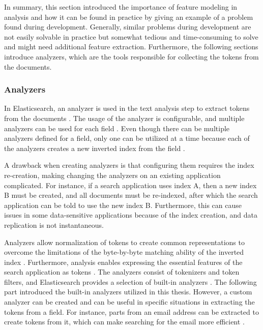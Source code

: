 In summary, this section introduced the importance of feature modeling in analysis and 
how it can be found in practice by giving an example of a problem found during development.
Generally, similar problems during development are not easily solvable in practice but somewhat
tedious and time-consuming to solve and might need additional feature extraction.
Furthermore, the following sections introduce analyzers, which are the tools responsible
for collecting the tokens from the documents.


\subsubsection{Analyzers}

In Elasticsearch, an analyzer is used in the text analysis step to extract tokens from the documents \cite{elasticIntro}.
The usage of the analyzer is configurable, and multiple analyzers can be used for each field \cite{relevantSearch}.
Even though there can be multiple analyzers defined for a field, only one can be utilized at a time
because each of the analyzers creates a new inverted index from the field \cite{relevantSearch}.


A drawback when creating analyzers is that configuring them requires the index re-creation, making changing the analyzers 
on an existing application complicated.
For instance, if a search application uses index A, then a new index B must be created, and 
all documents must be re-indexed,
after which the search application can be told to use the new index B.
Furthermore, this can cause issues in some data-sensitive applications because of the index creation, 
and data replication is not instantaneous.


Analyzers allow normalization of tokens to create common representations to overcome the limitations of the byte-by-byte
matching ability of the inverted index \cite{relevantSearch}.
Furthermore, analysis enables expressing the essential features of the search application as tokens \cite{relevantSearch}.
The analyzers consist of tokenizers and token filters, and Elasticsearch provides a selection of 
built-in analyzers \cite{elasticIntro}.
The following part introduced the built-in analyzers utilized in this thesis.
However, a custom analyzer can be created and can be useful in specific situations in extracting the tokens from 
a field.
For instance, parts from an email address can be extracted to create tokens from it, 
which can make searching for the email more efficient \cite{relevantSearch}.


